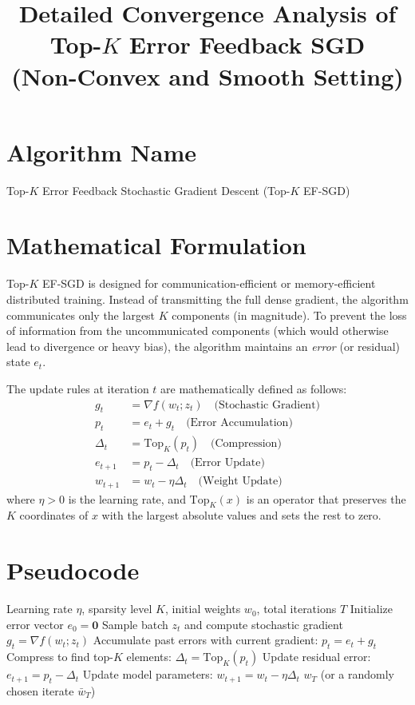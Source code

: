 \documentclass{article}
\title{Detailed Convergence Analysis of Top-$K$ Error Feedback SGD \\ (Non-Convex and Smooth Setting)}
\date{}
\begin{document}
\maketitle

\section*{Algorithm Name}
Top-$K$ Error Feedback Stochastic Gradient Descent (Top-$K$ EF-SGD)

\section*{Mathematical Formulation}
Top-$K$ EF-SGD is designed for communication-efficient or memory-efficient distributed training. Instead of transmitting the full dense gradient, the algorithm communicates only the largest $K$ components (in magnitude). To prevent the loss of information from the uncommunicated components (which would otherwise lead to divergence or heavy bias), the algorithm maintains an \textit{error} (or residual) state $e_t$.

The update rules at iteration $t$ are mathematically defined as follows:
\begin{align*}
    g_t &= \nabla f(w_t; z_t) \quad \text{(Stochastic Gradient)} \\
    p_t &= e_t + g_t \quad \text{(Error Accumulation)} \\
    \Delta_t &= \text{Top}_K(p_t) \quad \text{(Compression)} \\
    e_{t+1} &= p_t - \Delta_t \quad \text{(Error Update)} \\
    w_{t+1} &= w_t - \eta \Delta_t \quad \text{(Weight Update)}
\end{align*}
where $\eta > 0$ is the learning rate, and $\text{Top}_K(x)$ is an operator that preserves the $K$ coordinates of $x$ with the largest absolute values and sets the rest to zero.

\section*{Pseudocode}
\begin{algorithm}[H]
\caption{Top-$K$ EF-SGD}
\begin{algorithmic}[1]
\REQUIRE Learning rate $\eta$, sparsity level $K$, initial weights $w_0$, total iterations $T$
\STATE Initialize error vector $e_0 = \mathbf{0}$
    \STATE Sample batch $z_t$ and compute stochastic gradient $g_t = \nabla f(w_t; z_t)$
    \STATE Accumulate past errors with current gradient: $p_t = e_t + g_t$
    \STATE Compress to find top-$K$ elements: $\Delta_t = \text{Top}_K(p_t)$
    \STATE Update residual error: $e_{t+1} = p_t - \Delta_t$
    \STATE Update model parameters: $w_{t+1} = w_t - \eta \Delta_t$
\ENDFOR
\RETURN $w_T$ (or a randomly chosen iterate $\bar{w}_T$)
\end{algorithmic}
\end{algorithm}
\end{document}
